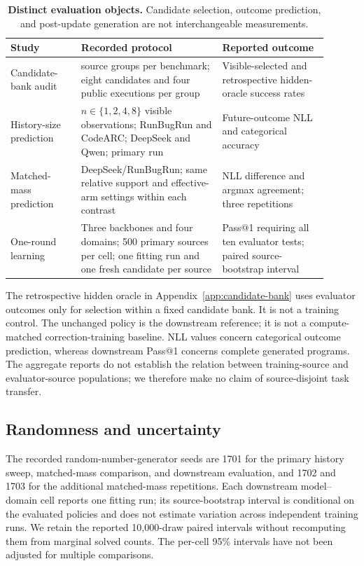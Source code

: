 \documentclass{article}
\begin{document}
\begin{table}[htbp]
\centering
\small
\caption{\textbf{Distinct evaluation objects.} Candidate selection, outcome prediction, and post-update generation are not interchangeable measurements.}
\setlength{\tabcolsep}{5pt}
\renewcommand{\arraystretch}{1.15}
\begin{tabular}{>{\raggedright\arraybackslash}p{0.20\linewidth}>{\raggedright\arraybackslash}p{0.40\linewidth}>{\raggedright\arraybackslash}p{0.30\linewidth}}
\toprule
Study & Recorded protocol & Reported outcome \\
\midrule
Candidate-bank audit & 500 source groups per benchmark; eight candidates and four public executions per group & Visible-selected and retrospective hidden-oracle success rates \\
History-size prediction & $n\in\{1,2,4,8\}$ visible observations; RunBugRun and CodeARC; DeepSeek and Qwen; primary run & Future-outcome NLL and categorical accuracy \\
Matched-mass prediction & DeepSeek/RunBugRun; same relative support and effective-arm settings within each contrast & NLL difference and argmax agreement; three repetitions \\
One-round learning & Three backbones and four domains; 500 primary sources per cell; one fitting run and one fresh candidate per source & Pass@1 requiring all ten evaluator tests; paired source-bootstrap interval \\
\bottomrule
\end{tabular}
\label{tab:protocols}
\end{table}

The retrospective hidden oracle in Appendix~\ref{app:candidate-bank} uses evaluator outcomes only for selection within a fixed candidate bank. It is not a training control. The unchanged policy is the downstream reference; it is not a compute-matched correction-training baseline. NLL values concern categorical outcome prediction, whereas downstream Pass@1 concerns complete generated programs. The aggregate reports do not establish the relation between training-source and evaluator-source populations; we therefore make no claim of source-disjoint task transfer.

\subsection{Randomness and uncertainty}
\label{app:randomness}

The recorded random-number-generator seeds are 1701 for the primary
history sweep, matched-mass comparison, and downstream evaluation, and
1702 and 1703 for the additional matched-mass repetitions. Each downstream
model--domain cell reports one fitting run; its source-bootstrap interval
is conditional on the evaluated policies and does not estimate variation
across independent training runs. We retain the reported 10,000-draw
paired intervals without recomputing them from marginal solved counts.
The per-cell 95\% intervals have not been adjusted for multiple comparisons.
\end{document}

